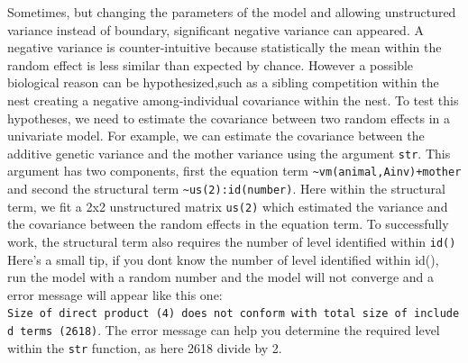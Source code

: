 \documentclass[
  12pt,
]{book}
\begin{document}
Sometimes, but changing the parameters of the model and allowing unstructured variance instead of boundary, significant negative variance can appeared.
A negative variance is counter-intuitive because statistically the mean within the random effect is less similar than expected by chance. However a possible biological reason can be hypothesized,such as a sibling competition within the nest creating a negative among-individual covariance within the nest.
To test this hypotheses, we need to estimate the covariance between two random effects in a univariate model.
For example, we can estimate the covariance between the additive genetic variance and the mother variance using the argument \texttt{str}. This argument has two components, first the equation term \texttt{\textasciitilde{}vm(animal,Ainv)+mother} and second the structural term \texttt{\textasciitilde{}us(2):id(number)}. Here within the structural term, we fit a 2x2 unstructured matrix \texttt{us(2)} which estimated the variance and the covariance between the random effects in the equation term. To successfully work, the structural term also requires the number of level identified within \texttt{id()}
Here's a small tip, if you dont know the number of level identified within id(), run the model with a random number and the model will not converge and a error message will appear like this one: \texttt{Size\ of\ direct\ product\ (4)\ does\ not\ conform\ with\ total\ size\ of\ included\ terms\ (2618)}. The error message can help you determine the required level within the \texttt{str} function, as here 2618 divide by 2.
\end{document}
